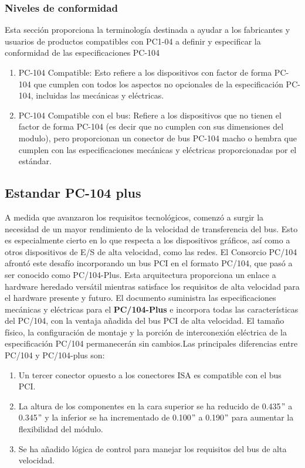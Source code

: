 \documentclass[12pt]{article}
\begin{document}
	\subsubsection{Niveles de conformidad}
	Esta sección proporciona la terminología destinada a ayudar a los fabricantes y usuarios de productos compatibles con PC1-04 a definir y especificar la conformidad de las especificaciones PC-104
	\begin{enumerate}
		\item PC-104 Compatible: Esto refiere a los dispositivos con factor de forma PC-104 que cumplen con todos los aspectos no opcionales de la especificación PC-104, incluidas las mecánicas y eléctricas.
		
		\item PC-104 Compatible con el bus: Refiere a los dispositivos que no tienen el factor de forma PC-104 (es decir que no cumplen con sus dimensiones del modulo), pero proporcionan un conector de bus PC-104 macho o hembra que cumplen con las especificaciones mecánicas y eléctricas proporcionadas por el estándar.
	\end{enumerate}
	
	\subsection{Estandar PC-104 plus}
	A medida que avanzaron los requisitos tecnológicos, comenzó a surgir la necesidad de un mayor rendimiento de la velocidad de transferencia del bus. Esto es especialmente cierto en lo que respecta a los dispositivos gráficos, así como a otros dispositivos de E/S de alta velocidad, como las redes. El Consorcio PC/104 afrontó este desafío incorporando un bus PCI en el formato PC/104, que pasó a ser conocido como PC/104-Plus. Esta arquitectura proporciona un enlace a hardware heredado versátil mientras satisface los requisitos de alta velocidad para el hardware presente y futuro. El documento \cite{pc104plus:spec2008_report} suministra las especificaciones mecánicas y eléctricas para el \textbf{PC/104-Plus} e incorpora todas las características del PC/104, con la ventaja añadida del bus PCI de alta velocidad. El tamaño físico, la configuración de montaje y la porción de interconexión eléctrica de la especificación PC/104 permanecerán sin cambios.Las principales diferencias entre PC/104 y PC/104-plus son:
	
	\begin{enumerate}
		\item Un tercer conector opuesto a los conectores ISA es compatible con el bus PCI.
		
		\item La altura de los componentes en la cara superior se ha reducido de 0.435$"$ a 0.345$"$ y la inferior se ha incrementado de 0.100$"$ a 0.190$"$ para aumentar la flexibilidad del módulo.
		
		\item Se ha añadido lógica de control para manejar los requisitos del bus de alta velocidad.
	\end{enumerate}
	
\end{document}

